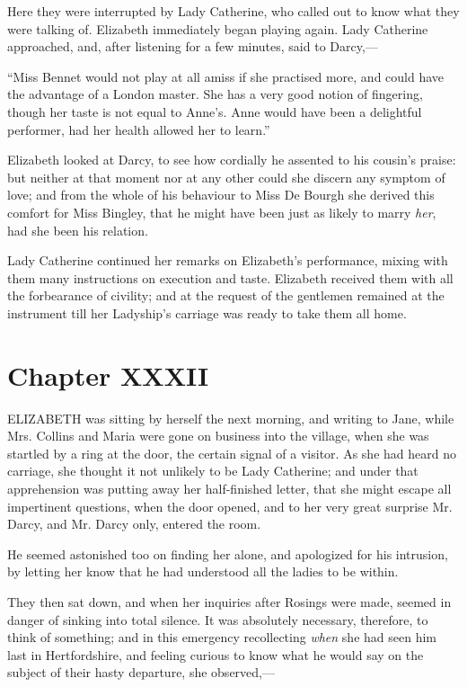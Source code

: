 \documentclass[12pt,openright]{book}
\begin{document}
Here they were interrupted by Lady Catherine, who called out to know what they were talking of. Elizabeth immediately began playing again. Lady Catherine approached, and, after listening for a few minutes, said to Darcy,—

“Miss Bennet would not play at all amiss if she practised more, and could have the advantage of a London master. She has a very good notion of fingering, though her taste is not equal to Anne’s. Anne would have been a delightful performer, had her health allowed her to learn.”

Elizabeth looked at Darcy, to see how cordially he assented to his cousin’s praise: but neither at that moment nor at any other could she discern any symptom of love; and from the whole of his behaviour to Miss De Bourgh she derived this comfort for Miss Bingley, that he might have been just as likely to marry \textit{her}, had she been his relation.

Lady Catherine continued her remarks on Elizabeth’s performance, mixing with them many instructions on execution and taste. Elizabeth received them with all the forbearance of civility; and at the request of the gentlemen remained at the instrument till her Ladyship’s carriage was ready to take them all home.

\chapter{Chapter XXXII}

\noindent  ELIZABETH was sitting by herself the next morning, and writing to Jane, while Mrs. Collins and Maria were gone on business into the village, when she was startled by a ring at the door, the certain signal of a visitor. As she had heard no carriage, she thought it not unlikely to be Lady Catherine; and under that apprehension was putting away her half-finished letter, that she might escape all impertinent questions, when the door opened, and to her very great surprise Mr. Darcy, and Mr. Darcy only, entered the room.

He seemed astonished too on finding her alone, and apologized for his intrusion, by letting her know that he had understood all the ladies to be within.

They then sat down, and when her inquiries after Rosings were made, seemed in danger of sinking into total silence. It was absolutely necessary, therefore, to think of something; and in this emergency recollecting \textit{when} she had seen him last in Hertfordshire, and feeling curious to know what he would say on the subject of their hasty departure, she observed,—
\end{document}
